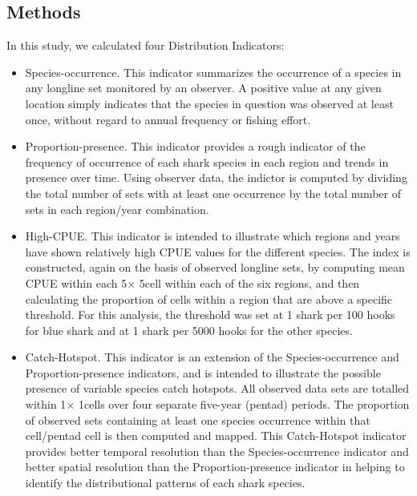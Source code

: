 \documentclass[12pt]{SCreport}
\begin{document}
      
      \subsection{Methods}
      In this study, we calculated four Distribution Indicators:
      
\begin{itemize}
\item	Species-occurrence.  This indicator summarizes the occurrence of a species in any longline set monitored by an observer.  A positive value at any given location simply indicates that the species in question was observed at least once, without regard to annual frequency or fishing effort.
\item	Proportion-presence.  This indicator provides a rough indicator of the frequency of occurrence of each shark species in each region and trends in presence over time.  Using observer data, the indictor is computed by dividing the total number of sets with at least one occurrence by the total number of sets in each region/year combination.
\item	High-CPUE.  This indicator is intended to illustrate which regions and years have shown relatively high CPUE values for the different species.  The index is constructed, again on the basis of observed longline sets, by computing mean CPUE within each 5\degree $\times$ 5\degree cell within each of the six regions, and then calculating the proportion of cells within a region that are above a specific threshold.  For this analysis, the threshold was set at 1 shark per 100 hooks for blue shark and at 1 shark per 5000 hooks for the other species.
\item	Catch-Hotspot.  This indicator is an extension of the Species-occurrence and Proportion-presence indicators, and is intended to illustrate the possible presence of variable species catch hotspots.  All observed data sets are totalled within 1\degree $\times$ 1\degree cells over four separate five-year (pentad) periods.  The proportion of observed sets containing at least one species occurrence within that cell/pentad cell is then computed and mapped.  This Catch-Hotspot indicator provides better temporal resolution than the Species-occurrence indicator and better spatial resolution than the Proportion-presence indicator in helping to identify the distributional patterns of each shark species.
\end{itemize}
\end{document}
